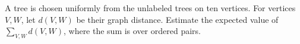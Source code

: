 A tree is chosen uniformly from the unlabeled trees on ten vertices. For vertices $V,W$, let $d(V,W)$ be their graph distance. Estimate the expected value of $\sum_{V,W}d(V,W)$, where the sum is over ordered pairs.
